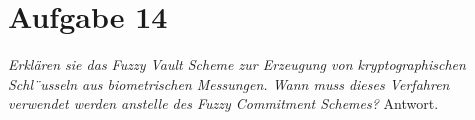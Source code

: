 \section{Aufgabe 14}
    \textit{Erklären sie das Fuzzy Vault Scheme zur Erzeugung von kryptographischen Schl¨usseln
    aus biometrischen Messungen. Wann muss dieses Verfahren verwendet werden anstelle
    des Fuzzy Commitment Schemes?}\vspace*{1em}\newline
    Antwort.
